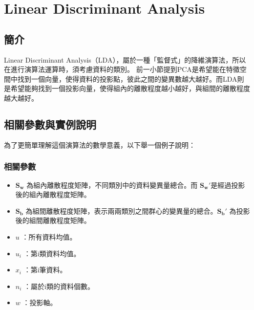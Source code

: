 \chapter{Linear Discriminant Analysis}
\label{chapter:lda}
\section{簡介}
\label{sec:lda_introduction}




Linear Discriminant Analysis（LDA），屬於一種「監督式」的降維演算法，所以在進行演算法運算時，須考慮資料的類別。
前一小節提到PCA是希望能在特徵空間中找到一個向量，使得資料的投影點，彼此之間的變異數越大越好。而LDA則是希望能夠找到一個投影向量，使得組內的離散程度越小越好，與組間的離散程度越大越好。




\section{相關參數與實例說明}
為了更簡單理解這個演算法的數學意義，以下舉一個例子說明：


\subsection{相關參數}

\begin{itemize}
	\item
	      \(\mathbf{S_w}\) 為組內離散程度矩陣，不同類別中的資料變異量總合。而 \(\mathbf{{S_w}'}\)是經過投影後的組內離散程度矩陣。
	\item
	      \(\mathbf{S_b}\) 為組間離散程度矩陣，表示兩兩類別之間群心的變異量的總合。\(\mathbf{{S_b}'}\) 為投影後的組間離散程度矩陣。
	\item
	      \(u\) ：所有資料均值。
	\item
	      \(u_i\) ：第i類資料均值。
	\item
	      \(x_i\) ：第i筆資料。
	\item
	      \(n_i\) ：屬於i類的資料個數。
	\item
	      \(w\) ：投影軸。
\end{itemize}

